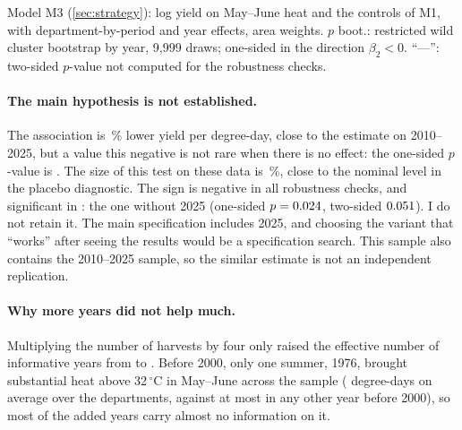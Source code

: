 \begin{table}[H]
\centering
\small
\caption{Wheat 1959--2025: heat above 32\,$^{\circ}$C in May--June (83 departments, \QtwoN{} observations)}
\label{tab:wheat-long}
\begin{threeparttable}

\begin{tablenotes}\footnotesize
\item Model M3 (\cref{sec:strategy}): log yield on May--June heat and the controls of M1, with department-by-period and year effects, area weights. $p$ boot.: restricted wild cluster bootstrap by year, 9,999 draws; one-sided in the direction $\beta_2 < 0$. ``---'': two-sided $p$-value not computed for the robustness checks.
\end{tablenotes}
\end{threeparttable}
\end{table}

\paragraph{The main hypothesis is not established.} The association is \QtwoPct\,\% lower yield per degree-day, close to the estimate on 2010--2025, but a value this negative is not rare when there is no effect: the one-sided $p$-value is \QtwoP. The size of this test on these data is \QtwoSizeWCR\,\%, close to the nominal level in the placebo diagnostic. The sign is negative in all \QtwoRobTot{} robustness checks, and significant in \QtwoRobSig: the one without 2025 (one-sided $p = 0.024$, two-sided $0.051$). I do not retain it. The main specification includes 2025, and choosing the variant that ``works'' after seeing the results would be a specification search. This sample also contains the 2010--2025 sample, so the similar estimate is not an independent replication.

\paragraph{Why more years did not help much.} Multiplying the number of harvests by four only raised the effective number of informative years from \NeffWheat{} to \NeffWheatLong. Before 2000, only one summer, 1976, brought substantial heat above 32\,$^{\circ}$C in May--June across the sample (\HeatSeventySix{} degree-days on average over the departments, against at most \HeatPreTwoThousandOtherMax{} in any other year before 2000), so most of the added years carry almost no information on it.

